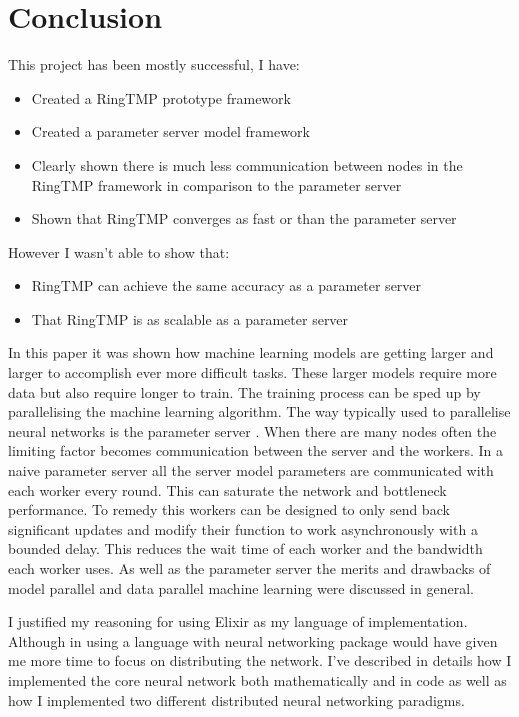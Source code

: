\section{Conclusion}
This project has been mostly successful, I have:
\begin{itemize}
    \item Created a RingTMP prototype framework
    \item Created a parameter server model framework
    \item Clearly shown there is much less communication between nodes in the
    RingTMP framework in comparison to the parameter server
    \item Shown that RingTMP converges as fast or than the parameter server
\end{itemize}

However I wasn't able to show that:
\begin{itemize}
    \item RingTMP can achieve the same accuracy as a parameter server
    \item That RingTMP is as scalable as a parameter server
\end{itemize}
In this paper it was shown how machine learning models are getting larger and
larger to accomplish ever more difficult tasks. These larger models require more
data but also require longer to train. The training process can be sped up by
parallelising the machine learning algorithm. \cite{newman2008distributed} The
way typically used to parallelise neural networks is the parameter server
\cite{LI2014ParameterServers}. When there are many nodes often the limiting
factor becomes communication between the server and the workers. In a naive
parameter server all the server model parameters are communicated with each
worker every round. This can saturate the network and bottleneck performance. To
remedy this workers can be designed to only send back significant updates and
modify their function to work asynchronously with a bounded delay.
\cite{li2014communication} This reduces the wait time of each worker and the
bandwidth each worker uses. As well as the parameter server the merits and
drawbacks of model parallel and data parallel machine learning were discussed in
general.

I justified my reasoning for using Elixir as my language of implementation.
Although in using a language with neural networking package would have given me
more time to focus on distributing the network. I've described in details how I
implemented the core neural network both mathematically and in code as well as
how I implemented two different distributed neural networking paradigms.

